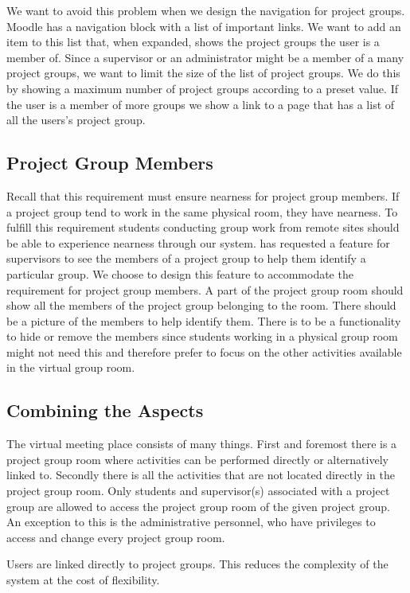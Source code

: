 We want to avoid this problem when we design the navigation for project groups.
Moodle has a navigation block with a list of important links.
We want to add an item to this list that, when expanded, shows the project groups the user is a member of.
Since a supervisor or an administrator might be a member of a many project groups, we want to limit the size of the list of project groups.
We do this by showing a maximum number of project groups according to a preset value.
If the user is a member of more groups we show a link to a page that has a list of all the users's project group.


\subsection{Project Group Members}
\label{sub:projGrpMembers}
Recall that this requirement must ensure nearness for project group members.
If a project group tend to work in the same physical room, they have nearness.
To fulfill this requirement students conducting group work from remote sites should be able to experience nearness through our system.
\supervisorgroup{} has requested a feature for supervisors to see the members of a project group to help them identify a particular group.
We choose to design this feature to accommodate the requirement for project group members.
A part of the project group room should show all the members of the project group belonging to the room.
There should be a picture of the members to help identify them.
There is to be a functionality to hide or remove the members since students working in a physical group room might not need this and therefore prefer to focus on the other activities available in the virtual group room.


\subsection{Combining the Aspects}
The virtual meeting place consists of many things.
First and foremost there is a project group room where activities can be performed directly or alternatively linked to.
Secondly there is all the activities that are not located directly in the project group room.
Only students and supervisor(s) associated with a project group are allowed to access the project group room of the given project group.
An exception to this is the administrative personnel, who have privileges to access and change every project group room.

Users are linked directly to project groups.
This reduces the complexity of the system at the cost of flexibility.















\FloatBarrier